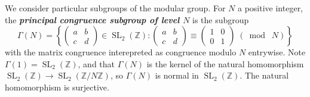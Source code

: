 \documentclass[10pt,leqno]{article}
\newcommand{\cbr}[1]{\left\{#1\right\}}
\newcommand{\textib}[1]{\textbf{\textit{#1}}}
\DeclareMathOperator{\SL}{SL}
\newcommand{\smod}[1]{\;(\bmod\; #1)}
\begin{document}
We consider particular subgroups of the modular group. For $N$ a positive integer, the \textib{principal congruence subgroup of level $N$} is the subgroup
\[\varGamma(N) = \cbr{\begin{pmatrix}
    a & b \\ c & d
\end{pmatrix}\in \SL_2(\mathbb{Z}): \begin{pmatrix}
    a & b \\ c & d
\end{pmatrix}\equiv \begin{pmatrix}
    1 & 0 \\ 0 & 1
\end{pmatrix}\smod N}\]
with the matrix congruence interepreted as congruence modulo $N$ entrywise. Note $\varGamma(1) = \SL_2(\mathbb{Z})$, and that $\varGamma(N)$ is the kernel of the natural homomorphism $\SL_2(\mathbb{Z})\to \SL_2(\mathbb{Z}/N\mathbb{Z})$, so $\varGamma(N)$ is normal in $\SL_2(\mathbb{Z})$. The natural homomorphism is surjective.
\end{document}
